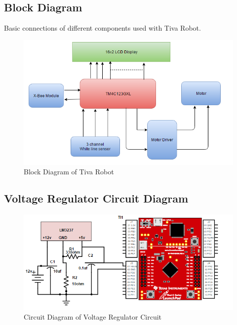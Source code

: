 \documentclass[a4paper,12pt,oneside]{book}
\begin{document}
\subsection*{Block Diagram}
Basic connections of different components used with Tiva Robot.
\\
\begin{figure}[h]
        \centering
        \includegraphics[scale=0.7]{Block}
        \caption{Block Diagram of Tiva Robot}
      \end{figure}
\subsection*{Voltage Regulator Circuit Diagram}
\begin{figure}[h]
	\centering
	\includegraphics[scale=0.7]{Voltage_Regulator_Circuit}
	\caption{Circuit Diagram of Voltage Regulator Circuit}
\end{figure}

      \newpage
\end{document}
